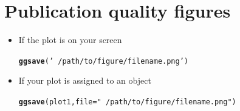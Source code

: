 \documentclass{beamer}\usepackage[]{graphicx}\usepackage[]{color}
\makeatletter
\newcommand{\hlstr}[1]{\textcolor[rgb]{0.192,0.494,0.8}{#1}}%
\newcommand{\hlstd}[1]{\textcolor[rgb]{0.345,0.345,0.345}{#1}}%
\newcommand{\hlkwc}[1]{\textcolor[rgb]{0.333,0.667,0.333}{#1}}%
\newcommand{\hlkwd}[1]{\textcolor[rgb]{0.737,0.353,0.396}{\textbf{#1}}}%
\newenvironment{kframe}{%
 \def\at@end@of@kframe{}%
 \ifinner\ifhmode%
  \def\at@end@of@kframe{\end{minipage}}%
  \begin{minipage}{\columnwidth}%
 \fi\fi%
 \def\FrameCommand##1{\hskip\@totalleftmargin \hskip-\fboxsep
 \colorbox{shadecolor}{##1}\hskip-\fboxsep
     \hskip-\linewidth \hskip-\@totalleftmargin \hskip\columnwidth}%
 \MakeFramed {\advance\hsize-\width
   \@totalleftmargin\z@ \linewidth\hsize
   \@setminipage}}%
 {\par\unskip\endMakeFramed%
 \at@end@of@kframe}
\newenvironment{knitrout}{}{} %
\makeatother
\begin{document}


\section*{Publication quality figures}
\frame{\sectionpage}



\begin{frame}[fragile]
\begin{itemize}
\item If the plot is on your screen
\begin{knitrout}\footnotesize
{}\color{fgcolor}\begin{kframe}
\begin{alltt}
\hlkwd{ggsave}\hlstd{(}\hlstr{'~/path/to/figure/filename.png'}\hlstd{)}
\end{alltt}
\end{kframe}
\end{knitrout}
\item If your plot is assigned to an object
\begin{knitrout}\footnotesize
{}\color{fgcolor}\begin{kframe}
\begin{alltt}
\hlkwd{ggsave}\hlstd{(plot1,} \hlkwc{file} \hlstd{=} \hlstr{"~/path/to/figure/filename.png"}\hlstd{)}
\end{alltt}
\end{kframe}
\end{knitrout}


\end{itemize}
\end{frame}
\end{document}
